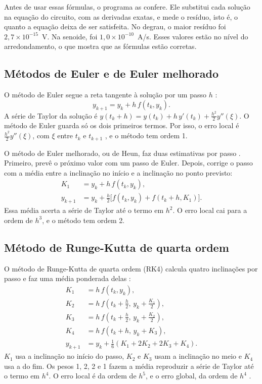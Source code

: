 Antes de usar essas fórmulas, o programa as confere. Ele substitui cada solução na equação do circuito, com as derivadas exatas, e mede o resíduo, isto é, o quanto a equação deixa de ser satisfeita. No degrau, o maior resíduo foi \(2{,}7\times10^{-15}\)~V. Na senoide, foi \(1{,}0\times10^{-10}\)~A/s. Esses valores estão no nível do arredondamento, o que mostra que as fórmulas estão corretas.

\subsection{Métodos de Euler e de Euler melhorado}

O método de Euler segue a reta tangente à solução por um passo \(h\) \cite[eq.~10.4]{aquino2020}:
\begin{equation}
y_{k+1}=y_k+h\,f(t_k,y_k).
\label{eq:euler}
\end{equation}
A série de Taylor da solução é \(y(t_k+h)=y(t_k)+h\,y'(t_k)+\frac{h^{2}}{2}y''(\xi)\). O método de Euler guarda só os dois primeiros termos. Por isso, o erro local é \(\frac{h^{2}}{2}y''(\xi)\), com \(\xi\) entre \(t_k\) e \(t_{k+1}\) \cite[p.~178]{aquino2020}, e o método tem ordem 1.

O método de Euler melhorado, ou de Heun, faz duas estimativas por passo \cite[eq.~10.6]{aquino2020}. Primeiro, prevê o próximo valor com um passo de Euler. Depois, corrige o passo com a média entre a inclinação no início e a inclinação no ponto previsto:
\begin{align}
K_1&=y_k+h\,f(t_k,y_k), \nonumber\\
y_{k+1}&=y_k+\frac{h}{2}\bigl[f(t_k,y_k)+f(t_k+h,K_1)\bigr]. \label{eq:heun}
\end{align}
Essa média acerta a série de Taylor até o termo em \(h^{2}\). O erro local cai para a ordem de \(h^{3}\), e o método tem ordem 2.

\subsection{Método de Runge-Kutta de quarta ordem}

O método de Runge-Kutta de quarta ordem (RK4) calcula quatro inclinações por passo e faz uma média ponderada delas \cite[seção~10.3.2]{aquino2020}:
\begin{align}
K_1&=h\,f(t_k,y_k), \nonumber\\
K_2&=h\,f\!\left(t_k+\tfrac{h}{2},\,y_k+\tfrac{K_1}{2}\right), \nonumber\\
K_3&=h\,f\!\left(t_k+\tfrac{h}{2},\,y_k+\tfrac{K_2}{2}\right), \nonumber\\
K_4&=h\,f(t_k+h,\,y_k+K_3), \nonumber\\
y_{k+1}&=y_k+\frac{1}{6}\left(K_1+2K_2+2K_3+K_4\right). \label{eq:rk4}
\end{align}
\(K_1\) usa a inclinação no início do passo, \(K_2\) e \(K_3\) usam a inclinação no meio e \(K_4\) usa a do fim. Os pesos 1, 2, 2 e 1 fazem a média reproduzir a série de Taylor até o termo em \(h^{4}\). O erro local é da ordem de \(h^{5}\), e o erro global, da ordem de \(h^{4}\) \cite{burden2008}.

